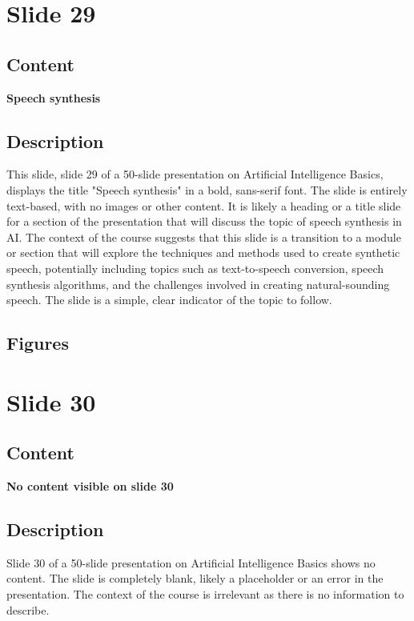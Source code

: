 \documentclass{article}%
\begin{document}
%
\newpage%
\section{Slide 29}%
\label{sec:Slide29}%
\subsection{Content}%

\textbf{Speech synthesis}
%
\subsection{Description}%
This slide, slide 29 of a 50-slide presentation on Artificial Intelligence Basics, displays the title "Speech synthesis" in a bold, sans-serif font.  The slide is entirely text-based, with no images or other content.  It is likely a heading or a title slide for a section of the presentation that will discuss the topic of speech synthesis in AI.  The context of the course suggests that this slide is a transition to a module or section that will explore the techniques and methods used to create synthetic speech, potentially including topics such as text-to-speech conversion, speech synthesis algorithms, and the challenges involved in creating natural-sounding speech.  The slide is a simple, clear indicator of the topic to follow.%
\subsection{Figures}%
\begin{figure}[H]%
\centering%
\end{figure}

%
\newpage%
\section{Slide 30}%
\label{sec:Slide30}%
\subsection{Content}%

\textbf{No content visible on slide 30}
%
\subsection{Description}%
Slide 30 of a 50-slide presentation on Artificial Intelligence Basics shows no content.  The slide is completely blank, likely a placeholder or an error in the presentation.  The context of the course is irrelevant as there is no information to describe.%
\end{document}
